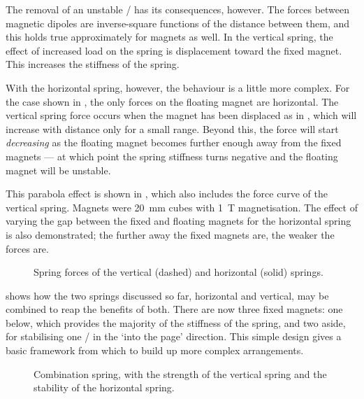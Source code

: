 \documentclass[11pt,a4paper]{memoir}
\begin{document}
The removal of an unstable \dof/ has its consequences, however.
The forces between magnetic dipoles are inverse-square functions of the distance between them, and this holds true approximately for magnets as well.
In the vertical spring, the effect of increased load on the spring is displacement toward the fixed magnet.
This increases the stiffness of the spring.

With the horizontal spring, however, the behaviour is a little more complex.
For the case shown in , the only forces on the floating magnet are horizontal.
The vertical spring force occurs when the magnet has been displaced as in , which will increase with distance only for a small range.
Beyond this, the force will start \emph{decreasing} as the floating magnet becomes further enough away from the fixed magnets — at which point the spring stiffness turns negative and the floating magnet will be unstable.

This parabola effect is shown in , which also includes the force curve of the vertical spring.
Magnets were \SI{20}{mm} cubes with \SI{1}{T} magnetisation.
The effect of varying the gap between the fixed and floating magnets for the horizontal spring is also demonstrated; the further away the fixed magnets are, the weaker the forces are.

\begin{figure}
  \caption[Spring forces of the vertical \& horizontal springs.]{
    Spring forces of the vertical (dashed) and horizontal (solid) springs.
  }
\end{figure}

 shows how the two springs discussed so far, horizontal and vertical, may be combined to reap the benefits of both.
There are now three fixed magnets: one below, which provides the majority of the stiffness of the spring, and two aside, for stabilising one \dof/ in the `into the page' direction.
This simple design gives a basic framework from which to build up more complex arrangements.

\begin{figure}
   \caption[Combination vertical/horizontal spring.]{Combination
spring, with the
strength of the vertical spring and the stability of the horizontal spring.}
\end{figure}
\end{document}
